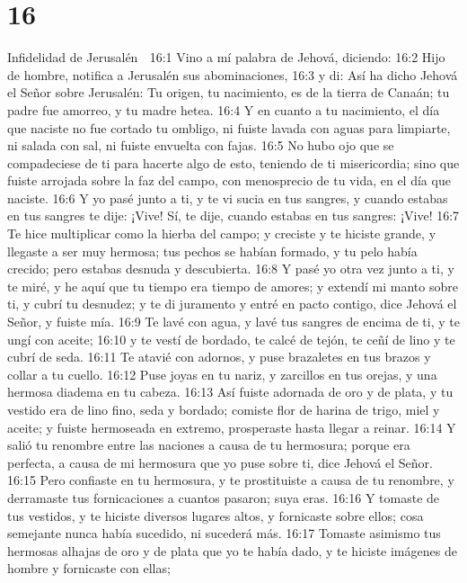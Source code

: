 \chapter{16}

Infidelidad de Jerusalén  

16:1 Vino a mí palabra de Jehová, diciendo:  
16:2 Hijo de hombre, notifica a Jerusalén sus abominaciones,  
16:3 y di: Así ha dicho Jehová el Señor sobre Jerusalén: Tu origen, tu nacimiento, es de la tierra de Canaán; tu padre fue amorreo, y tu madre hetea.  
16:4 Y en cuanto a tu nacimiento, el día que naciste no fue cortado tu ombligo, ni fuiste lavada con aguas para limpiarte, ni salada con sal, ni fuiste envuelta con fajas.  
16:5 No hubo ojo que se compadeciese de ti para hacerte algo de esto, teniendo de ti misericordia; sino que fuiste arrojada sobre la faz del campo, con menosprecio de tu vida, en el día que naciste.  
16:6 Y yo pasé junto a ti, y te vi sucia en tus sangres, y cuando estabas en tus sangres te dije: ¡Vive! Sí, te dije, cuando estabas en tus sangres: ¡Vive!  
16:7 Te hice multiplicar como la hierba del campo; y creciste y te hiciste grande, y llegaste a ser muy hermosa; tus pechos se habían formado, y tu pelo había crecido; pero estabas desnuda y descubierta.  
16:8 Y pasé yo otra vez junto a ti, y te miré, y he aquí que tu tiempo era tiempo de amores; y extendí mi manto sobre ti, y cubrí tu desnudez; y te di juramento y entré en pacto contigo, dice Jehová el Señor, y fuiste mía.  
16:9 Te lavé con agua, y lavé tus sangres de encima de ti, y te ungí con aceite;  
16:10 y te vestí de bordado, te calcé de tejón, te ceñí de lino y te cubrí de seda.  
16:11 Te atavié con adornos, y puse brazaletes en tus brazos y collar a tu cuello.  
16:12 Puse joyas en tu nariz, y zarcillos en tus orejas, y una hermosa diadema en tu cabeza.  
16:13 Así fuiste adornada de oro y de plata, y tu vestido era de lino fino, seda y bordado; comiste flor de harina de trigo, miel y aceite; y fuiste hermoseada en extremo, prosperaste hasta llegar a reinar.  
16:14 Y salió tu renombre entre las naciones a causa de tu hermosura; porque era perfecta, a causa de mi hermosura que yo puse sobre ti, dice Jehová el Señor.  
16:15 Pero confiaste en tu hermosura, y te prostituiste a causa de tu renombre, y derramaste tus fornicaciones a cuantos pasaron; suya eras.  
16:16 Y tomaste de tus vestidos, y te hiciste diversos lugares altos, y fornicaste sobre ellos; cosa semejante nunca había sucedido, ni sucederá más.  
16:17 Tomaste asimismo tus hermosas alhajas de oro y de plata que yo te había dado, y te hiciste imágenes de hombre y fornicaste con ellas;  
